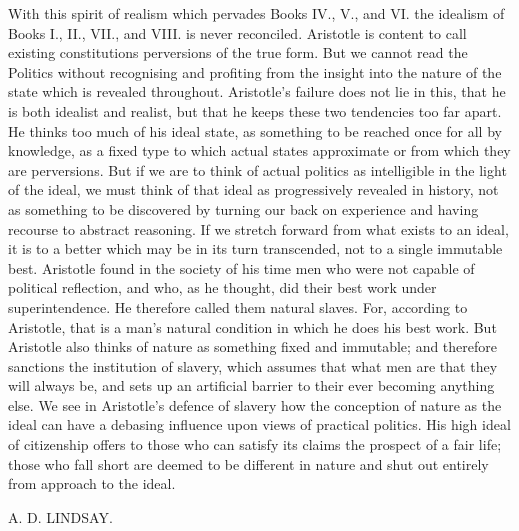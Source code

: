 With this spirit of realism which pervades Books IV., V., and VI. the
idealism of Books I., II., VII., and VIII. is never reconciled. Aristotle
is content to call existing constitutions perversions of the true form.
But we cannot read the Politics without recognising and profiting from the
insight into the nature of the state which is revealed throughout.
Aristotle's failure does not lie in this, that he is both idealist and
realist, but that he keeps these two tendencies too far apart. He thinks
too much of his ideal state, as something to be reached once for all by
knowledge, as a fixed type to which actual states approximate or from
which they are perversions. But if we are to think of actual politics as
intelligible in the light of the ideal, we must think of that ideal as
progressively revealed in history, not as something to be discovered by
turning our back on experience and having recourse to abstract reasoning.
If we stretch forward from what exists to an ideal, it is to a better
which may be in its turn transcended, not to a single immutable best.
Aristotle found in the society of his time men who were not capable of
political reflection, and who, as he thought, did their best work under
superintendence. He therefore called them natural slaves. For, according
to Aristotle, that is a man's natural condition in which he does his best
work. But Aristotle also thinks of nature as something fixed and
immutable; and therefore sanctions the institution of slavery, which
assumes that what men are that they will always be, and sets up an
artificial barrier to their ever becoming anything else. We see in
Aristotle's defence of slavery how the conception of nature as the ideal
can have a debasing influence upon views of practical politics. His high
ideal of citizenship offers to those who can satisfy its claims the
prospect of a fair life; those who fall short are deemed to be different
in nature and shut out entirely from approach to the ideal.

A. D. LINDSAY.



